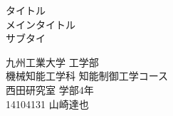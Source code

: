 \begin{titlepage}

  \vspace*{25mm}

  \begin{center}
    {\huge タイトル \\}
    \vspace{5mm}
    {\Huge メインタイトル \\}
    \vspace{20mm}
    {\Large サブタイ}
  \end{center}

  \vspace{25mm}

  \begin{flushright}
    {\LARGE 九州工業大学 工学部\\機械知能工学科 知能制御工学コース\\}
    \vspace{10mm}
    {\Large 西田研究室 学部4年\\14104131 山崎達也\\}
  \end{flushright}

\end{titlepage}
